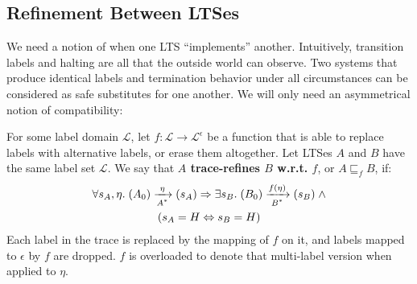 
\subsection{Refinement Between LTSes}

We need a notion of when one LTS ``implements'' another.  Intuitively,
transition labels and halting are all that the outside world
can observe. Two systems that produce identical labels and termination behavior
under all circumstances can be considered as safe substitutes for
one another. We will only need an asymmetrical notion of compatibility:

\begin{defn}\label{refines}
For some label domain $\mathcal L$, let $f : \mathcal L \to \mathcal L^\epsilon$ 
be a function that is able to replace labels with alternative
labels, or erase them altogether. Let LTSes $A$ and $B$ have the same label
set $\mathcal L$. We say that
\textbf{$A$ trace-refines $B$ w.r.t. $f$}, or $A \sqsubseteq_f B$, if:
\begin{multline*}
\forall s_A, \eta. \; \io{$A^{*}$}{A_0}{s_A}{\eta} \Rightarrow \exists s_B. \;
\io{$B^{*}$}{B_0}{s_B}{f(\eta)} \; \wedge \\
(s_A = H \Leftrightarrow s_B = H)
\end{multline*}
Each label in the trace is replaced by the mapping of $f$ on it, and
labels mapped to $\epsilon$ by $f$ are dropped. $f$ is overloaded
to denote that multi-label version when applied to $\eta$.
\end{defn}


